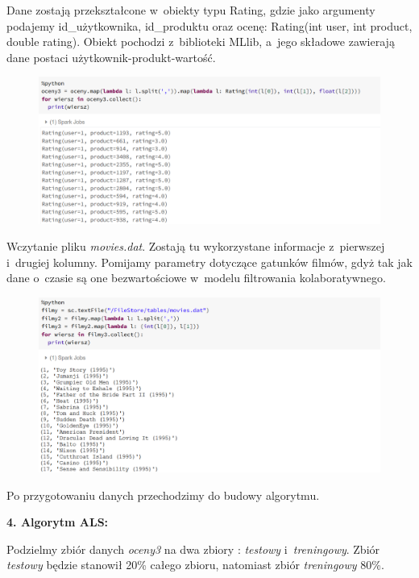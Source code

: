 \documentclass[12pt,a4paper]{report}
\begin{document}
Dane zostają przekształcone w~obiekty typu Rating, gdzie jako argumenty podajemy id\_użytkownika, id\_produktu oraz ocenę: Rating(int user, int product, double rating). Obiekt pochodzi z~biblioteki MLlib, a~jego składowe zawierają dane postaci użytkownik-produkt-wartość.

\begin{figure}[H]
\includegraphics[scale=0.5]{obrazy/ALS4.PNG} 
\end{figure}

Wczytanie pliku \textit{movies.dat}. 
Zostają tu wykorzystane informacje z~pierwszej i~drugiej kolumny. Pomijamy parametry dotyczące gatunków filmów, gdyż tak jak dane o~czasie są one bezwartościowe w~modelu filtrowania kolaboratywnego.

\begin{figure}[H]
\includegraphics[scale=0.5]{obrazy/ALS5.PNG} 
\end{figure}

Po przygotowaniu danych przechodzimy do budowy algorytmu.
\bigskip

\textbf{4. Algorytm ALS:}

Podzielmy zbiór danych \textit{oceny3} na dwa zbiory : \textit{testowy} i~\textit{treningowy}.
Zbiór \textit{testowy} będzie stanowił 20\% całego zbioru, natomiast zbiór \textit{treningowy} 80\%.
\end{document}
